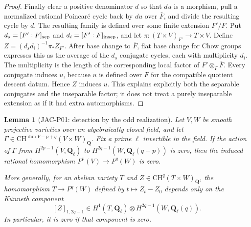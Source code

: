 \documentclass[11pt,a4paper]{article}
\newtheorem{lemma}[theorem]{Lemma}
\begin{document}
\begin{proof}
Finally clear a positive denominator $d$ so that $du$ is a morphism,
pull a normalized rational Poincar\'e cycle back by $du$ over
$\overline F$, and divide the resulting cycle by $d$.
The resulting family is defined over some finite
extension $F'/F$.  Put $d_s=[F':F]_{\rm sep}$ and
$d_i=[F':F]_{\rm insep}$, and let
$\pi:(T\times V)_{F'}\to T\times V$.
Define $Z=(d_sd_i)^{-1}\pi_*Z_{F'}$.  After base change to
$\overline F$, flat base change for Chow groups expresses this as
the average of the $d_s$ conjugate cycles, each with multiplicity
$d_i$.  The multiplicity is the length of the corresponding local
factor of $F'\otimes_F\overline F$.  Every conjugate induces $u$,
because $u$ is defined over $F$ for the compatible quotient descent
datum.  Hence $Z$ induces $u$.  This explains explicitly both the
separable conjugates and the inseparable factor; it does not treat a
purely inseparable extension as if it had extra automorphisms.
\end{proof}

\begin{lemma}[JAC-P01: detection by the odd realization]
\label{jac:P01}
Let $V,W$ be smooth projective varieties over an algebraically closed
field, and let
$\Gamma\in\mathrm{CH}^{\dim V-p+q}(V\times W)_{\mathbf Q}$.
Fix a prime $\ell$ invertible in the field.  If the action of $\Gamma$
from $H^{2p-1}(V,\mathbf Q_\ell)$ to
$H^{2q-1}(W,\mathbf Q_\ell(q-p))$ is zero, then the induced rational
homomorphism $P^p(V)\longrightarrow P^q(W)$ is zero.

More generally, for an abelian variety $T$ and
$Z\in\mathrm{CH}^q(T\times W)_{\mathbf Q}$, the homomorphism
$T\longrightarrow P^q(W)$ defined by $t\mapsto Z_t-Z_0$ depends only
on the K\"unneth component
\[
 [Z]_{1,2q-1}\in H^1(T,\mathbf Q_\ell)\otimes
 H^{2q-1}(W,\mathbf Q_\ell(q)).
\]
In particular, it is zero if that component is zero.
\end{lemma}
\end{document}
